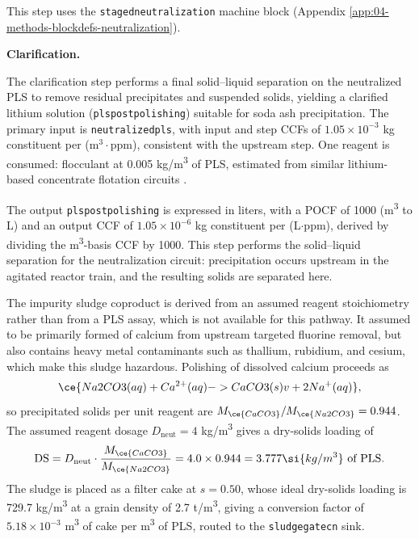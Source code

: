 \documentclass{article}
\renewcommand\_{\textunderscore\allowbreak}
\begin{document}
This step uses the \texttt{staged\_neutralization} machine block (Appendix \ref{app:04-methods-blockdefs-neutralization}).

\medskip
\noindent\textbf{Clarification.}\quad

The clarification step performs a final solid--liquid separation on the neutralized PLS to remove residual precipitates and suspended solids, yielding a clarified lithium solution (\texttt{pls\_post\_polishing}) suitable for soda ash precipitation. The primary input is \texttt{neutralized\_pls}, with input and step CCFs of $1.05 \times 10^{-3}$ kg constituent per (m$^3 \cdot$ppm), consistent with the upstream step. One reagent is consumed: flocculant at 0.005 \si{kg/m^3} of PLS, estimated from similar lithium-based concentrate flotation circuits \cite{opokuOverviewCoarseParticle2025, tramflocPolymersWaterWastewater2013}.
 
The output \texttt{pls\_post\_polishing} is expressed in liters, with a POCF of 1000 (\si{m^3} to L) and an output CCF of $1.05 \times 10^{-6}$ kg constituent per (L$\cdot$ppm), derived by dividing the \si{m^3}-basis CCF by 1000. This step performs the solid--liquid separation for the neutralization circuit: precipitation occurs upstream in the agitated reactor train, and the resulting solids are separated here.

The impurity sludge coproduct is derived from an assumed reagent stoichiometry rather than from a PLS assay, which is not available for this pathway. It assumed to be primarily formed of calcium from upstream targeted fluorine removal, but also contains heavy metal contaminants such as thallium, rubidium, and cesium, which make this sludge hazardous. Polishing of dissolved calcium proceeds as
\begin{equation}
	\ce{Na2CO3(aq) + Ca^{2+}(aq) -> CaCO3(s) v + 2Na^{+}(aq)},
\end{equation}
so precipitated solids per unit reagent are $M_{\ce{CaCO3}}/M_{\ce{Na2CO3}} = 0.944$. The assumed reagent dosage $D_\text{neut} = 4$ \si{kg/m^3} gives a dry-solids loading of
\begin{equation}
	\mathrm{DS} = D_\text{neut}\cdot\frac{M_{\ce{CaCO3}}}{M_{\ce{Na2CO3}}}
	            = 4.0 \times 0.944 = 3.777 \si{kg/m^3}\text{ of PLS}.
\end{equation}
The sludge is placed as a filter cake at $s = 0.50$, whose ideal dry-solids loading is 729.7 \si{kg/m^3} at a grain density of 2.7 \si{t/m^3}, giving a conversion factor of $5.18 \times 10^{-3}$ \si{m^3} of cake per \si{m^3} of PLS, routed to the \texttt{sludge\_gate\_cn\_50} sink.
\end{document}
